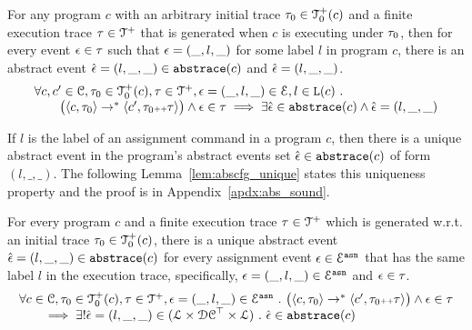 \begin{lem}
\label{lem:psRB-abscfg_sound}
For any program $c$ with 
 an arbitrary initial trace $\mathtt{\tau}_0 \in \mathcal{T}^{+}_0(c)$ and
 a finite execution trace $\mathtt{\tau} \in \mathcal{T}^{+}$ that is generated 
 when $c$ is executing under $\mathtt{\tau}_0$,
 then for every event $\mathtt{\epsilon} \in \mathtt{\tau}$ such that $\mathtt{\epsilon} = (\_, l, \_)$ for some label $l$ in program $c$,
 there is an abstract event $\hat{\mathtt{\epsilon}{}} = (l, \_, \_) \in \mathtt{abs}{\mathtt{trace}}(c)$ and $\hat{\mathtt{\epsilon}{}} = (l, \_, \_)$.
%
\[
\begin{array}{l}
 \forall c, c' \in \mathcal{C}, \mathtt{\tau}_0 \in \mathcal{T}^{+}_0(c), \mathtt{\tau} \in \mathcal{T}^{+} , \mathtt{\epsilon} = (\_, l, \_) \in \mathcal{E}, l \in \mathtt{L}(c) ~.~
 \\ \qquad 
 \big(
 \langle {c}, \mathtt{\tau}_0 \rangle \to^{*} \langle c', \mathtt{\tau}_0 {\scriptscriptstyle ++} \mathtt{\tau} \rangle 
 \big)
 \land \mathtt{\epsilon} \in \mathtt{\tau} 
 \implies \exists 
 \hat{\mathtt{\epsilon}{}} \in \mathtt{abs}{\mathtt{trace}}(c) \land \hat{\mathtt{\epsilon}{}} = (l, \_, \_)
\end{array}
\]
\end{lem}
If $l$ is the label of an assignment command in a program $c$,
then there is a unique abstract event in the program's abstract events set
$\hat{\mathtt{\epsilon}{}} \in \mathtt{abs}{\mathtt{trace}}(c)$ of form $(l, \_, \_)$. 
The following Lemma~\ref{lem:abscfg_unique} states this uniqueness property and the proof is in Appendix~\ref{apdx:abs_sound}.
\begin{lem}
\label{lem:abscfg_unique}
For every program $c$ and
a finite execution trace $\mathtt{\tau} \in \mathcal{T}^{+}$ which is generated w.r.t.
an initial trace $\mathtt{\tau}_0 \in \mathcal{T}^{+}_0(c)$,
there is a unique abstract event $\hat{\mathtt{\epsilon}{}} = (l, \_, \_) \in \mathtt{abs}{\mathtt{trace}}(c)$ 
for every assignment event $\mathtt{\epsilon} \in \mathcal{E}^{\mathtt{{asn}}}$ that has the same label $l$ in the
execution trace, specifically, $\mathtt{\epsilon} = (\_, l, \_) \in \mathcal{E}^{\mathtt{{asn}}}$ and $\mathtt{\epsilon} \in \mathtt{\tau}$.
%
\[
 \begin{array}{l}
 \forall c \in \mathcal{C}, \mathtt{\tau}_0 \in \mathcal{T}^{+}_0(c), \mathtt{\tau} \in \mathcal{T}^{+} , \mathtt{\epsilon} = (\_, l, \_) \in \mathcal{E}^{\mathtt{{asn}}} ~.~
 \big(
 \langle {c}, \mathtt{\tau}_0 \rangle \to^{*} \langle c', \mathtt{\tau}_0 {\scriptscriptstyle ++} \mathtt{\tau} \rangle 
 \big)
 \land \mathtt{\epsilon} \in \mathtt{\tau} 
 \\
 \qquad \implies \exists ! \hat{\mathtt{\epsilon}{}} = (l, \_, \_) \in (\mathcal{L}\times \mathcal{DC}^{\top} \times \mathcal{L}) ~.~ 
 \hat{\mathtt{\epsilon}{}} \in \mathtt{abs}{\mathtt{trace}}(c)
 \end{array}
\]
\end{lem}
%
